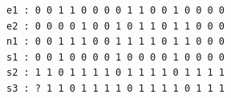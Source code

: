 \documentclass[a4paper,11pt]{article}
\begin{document}
\begin{verbatim}
e1 : 0 0 1 1 0 0 0 0 1 1 0 0 1 0 0 0 0
e2 : 0 0 0 0 1 0 0 1 0 1 1 0 1 1 0 0 0
n1 : 0 0 1 1 1 0 0 1 1 1 1 0 1 1 0 0 0
s1 : 0 0 1 0 0 0 0 1 0 0 0 0 1 0 0 0 0
s2 : 1 1 0 1 1 1 1 0 1 1 1 1 0 1 1 1 1
s3 : ? 1 1 0 1 1 1 1 0 1 1 1 1 0 1 1 1
\end{verbatim}


%
\end{document}
